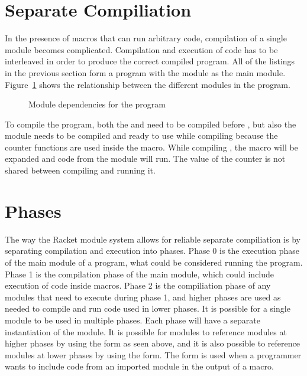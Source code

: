 \section{Separate Compiliation}
In the presence of macros that can run arbitrary code, compilation of a single module becomes complicated. 
Compilation and execution of code has to be interleaved in order to produce the correct compiled program.
All of the listings in the previous section form a program with the  module as the main module.
Figure~\ref{fig:modules.tex} shows the relationship between the different modules in the program.
\begin{figure}
  
  \caption{Module dependencies for the  program}
  \label{fig:modules.tex}
\end{figure}
To compile the program, both the  and  need to be compiled before , but also the  module needs to be compiled and ready to use while compiling  because the counter functions are used inside the  macro.
While compiling , the  macro will be expanded and code from the  module will run.
The value of the counter is not shared between compiling  and running it.

\section{Phases}
The way the Racket module system allows for reliable separate compiliation is by separating compilation and execution into phases.
Phase 0 is the execution phase of the main module of a program, what could be considered running the program.
Phase 1 is the compilation phase of the main module, which could include execution of code inside macros. 
Phase 2 is the compiliation phase of any modules that need to execute during phase 1, and higher phases are used as needed to compile and run code used in lower phases.
It is possible for a single module to be used in multiple phases.
Each phase will have a separate instantiation of the module.
It is possible for modules to reference modules at higher phases by using the  form as seen above, and it is also possible to reference modules at lower phases by using the  form.
The  form is used when a programmer wants to include code from an imported module in the output of a macro.

